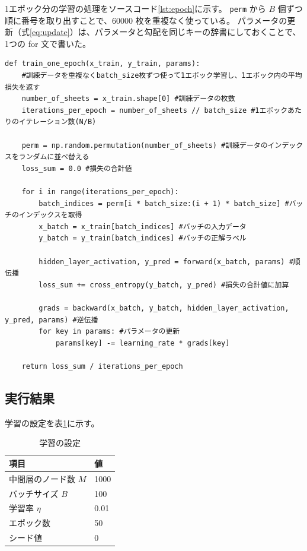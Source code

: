 \documentclass[a4paper,11pt]{ltjsarticle}
\begin{document}
1エポック分の学習の処理をソースコード\ref{lst:epoch}に示す。
\texttt{perm} から $B$ 個ずつ順に番号を取り出すことで、60000 枚を重複なく使っている。
パラメータの更新（式\eqref{eq:update}）は、パラメータと勾配を同じキーの辞書にしておくことで、1つの for 文で書いた。
\begin{lstlisting}[caption={1エポック分の学習}, label=lst:epoch]
def train_one_epoch(x_train, y_train, params):
    #訓練データを重複なくbatch_size枚ずつ使って1エポック学習し、1エポック内の平均損失を返す
    number_of_sheets = x_train.shape[0] #訓練データの枚数
    iterations_per_epoch = number_of_sheets // batch_size #1エポックあたりのイテレーション数(N/B)

    perm = np.random.permutation(number_of_sheets) #訓練データのインデックスをランダムに並べ替える
    loss_sum = 0.0 #損失の合計値

    for i in range(iterations_per_epoch):
        batch_indices = perm[i * batch_size:(i + 1) * batch_size] #バッチのインデックスを取得
        x_batch = x_train[batch_indices] #バッチの入力データ
        y_batch = y_train[batch_indices] #バッチの正解ラベル

        hidden_layer_activation, y_pred = forward(x_batch, params) #順伝播
        loss_sum += cross_entropy(y_batch, y_pred) #損失の合計値に加算

        grads = backward(x_batch, y_batch, hidden_layer_activation, y_pred, params) #逆伝播
        for key in params: #パラメータの更新
            params[key] -= learning_rate * grads[key]

    return loss_sum / iterations_per_epoch
\end{lstlisting}

\subsection{実行結果}
学習の設定を表\ref{tab:setting}に示す。
\begin{table}[H]
  \centering
  \caption{学習の設定}
  \label{tab:setting}
  \begin{tabular}{ll}
    \toprule
    項目 & 値 \\
    \midrule
    中間層のノード数 $M$ & 1000 \\
    バッチサイズ $B$     & 100 \\
    学習率 $\eta$        & 0.01 \\
    エポック数           & 50 \\
    シード値             & 0 \\
    \bottomrule
  \end{tabular}
\end{table}
\end{document}
